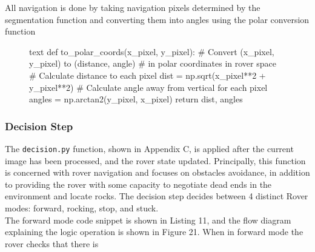 \documentclass[a4paper]{article}
\begin{document}
All navigation is done by taking navigation pixels determined by the segmentation function and converting them into angles using the polar conversion function

\begin{figure}[h]\scriptsize
\begin{sexylisting}{text}
def to_polar_coords(x_pixel, y_pixel):
    # Convert (x_pixel, y_pixel) to (distance, angle) 
    # in polar coordinates in rover space
    # Calculate distance to each pixel
    dist = np.sqrt(x_pixel**2 + y_pixel**2)
    # Calculate angle away from vertical for each pixel
    angles = np.arctan2(y_pixel, x_pixel)
    return dist, angles
\end{sexylisting}
\end{figure}

\subsubsection{Decision Step}
The \verb|decision.py| function, shown in Appendix C, is applied after the current image has been processed, and the rover state updated. Principally, this function is concerned with rover navigation and focuses on obstacles avoidance, in addition to providing the rover with some capacity to negotiate dead ends in the environment and locate rocks. The decision step decides between 4 distinct Rover modes: forward, rocking, stop, and stuck.\\

The forward mode code snippet is shown in Listing 11, and the flow diagram explaining the logic operation is shown in Figure 21. When in forward mode the rover checks that there is 
\end{document}

